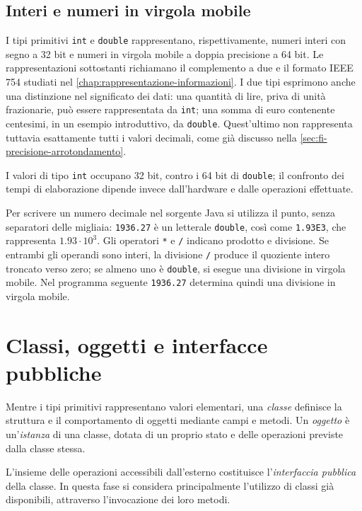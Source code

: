 \subsection{Interi e numeri in virgola mobile}
\label{sec:fi-java-tipi-numerici}

I tipi primitivi \texttt{int} e \texttt{double} rappresentano,
rispettivamente, numeri interi con segno a 32 bit e numeri in
virgola mobile a doppia precisione a 64 bit. Le rappresentazioni
sottostanti richiamano il complemento a due e il formato
IEEE 754 studiati nel \cref{chap:rappresentazione-informazioni}.
I due tipi esprimono anche una distinzione nel significato dei
dati: una quantità di lire, priva di unità frazionarie, può essere
rappresentata da \texttt{int}; una somma di euro contenente
centesimi, in un esempio introduttivo, da \texttt{double}.
Quest'ultimo non rappresenta tuttavia esattamente tutti i
valori decimali, come già discusso nella
\cref{sec:fi-precisione-arrotondamento}.

I valori di tipo \texttt{int} occupano 32 bit, contro i 64 bit
di \texttt{double}; il confronto dei tempi di elaborazione dipende
invece dall'hardware e dalle operazioni effettuate.

Per scrivere un numero decimale nel sorgente Java si utilizza
il punto, senza separatori delle migliaia: \texttt{1936.27}
è un letterale \texttt{double}, così come \texttt{1.93E3},
che rappresenta \(1.93\cdot10^3\). Gli operatori \texttt{*}
e \texttt{/} indicano prodotto e divisione. Se entrambi gli
operandi sono interi, la divisione \texttt{/} produce il
quoziente intero troncato verso zero; se almeno uno è
\texttt{double}, si esegue una divisione in virgola mobile.
Nel programma seguente \texttt{1936.27} determina quindi
una divisione in virgola mobile.



\section{Classi, oggetti e interfacce pubbliche}
\label{sec:fi-java-classi-oggetti}

Mentre i tipi primitivi rappresentano valori elementari, una
\emph{classe} definisce la struttura e il comportamento di oggetti
mediante campi e metodi. Un \emph{oggetto} è un'\emph{istanza}
di una classe, dotata di un proprio stato e delle operazioni
previste dalla classe stessa.

L'insieme delle operazioni accessibili dall'esterno costituisce
l'\emph{interfaccia pubblica} della classe. In questa fase si
considera principalmente l'utilizzo di classi già disponibili,
attraverso l'invocazione dei loro metodi.

